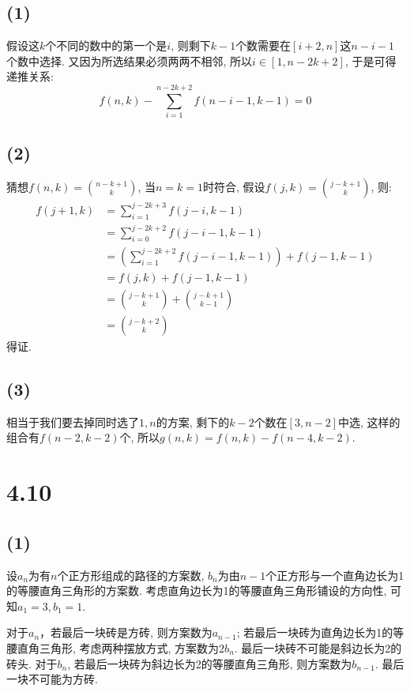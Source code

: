 \documentclass[UTF8,oneside]{article}
\begin{document}
\subsection{(1)}

假设这$k$个不同的数中的第一个是$i$, 则剩下$k-1$个数需要在$[i+2, n]$这$n-i-1$个数中选择. 又因为所选结果必须两两不相邻, 所以$i\in[1, n-2k+2]$, 于是可得递推关系:
\[
    f(n, k) - \sum_{i=1}^{n-2k+2} f(n-i-1, k-1) = 0
\]

\subsection{(2)}

猜想$f(n, k)=\binom{n-k+1}{k}$, 当$n=k=1$时符合, 假设$f(j, k)=\binom{j-k+1}{k}$, 则:
\begin{align*}
    f(j+1, k) &= \sum_{i=1}^{j-2k+3} f(j-i, k-1)\\
    &= \sum_{i=0}^{j-2k+2} f(j-i-1, k-1)\\
    &= \left (\sum_{i=1}^{j-2k+2} f(j-i-1, k-1) \right ) + f(j-1, k-1) \\
    &= f(j, k) + f(j-1, k-1) \\
    &= \binom{j-k+1}{k} + \binom{j-k+1}{k-1}\\
    &= \binom{j-k+2}{k}
\end{align*}
得证.

\subsection{(3)}

相当于我们要去掉同时选了$1,n$的方案, 剩下的$k-2$个数在$[3, n-2]$中选, 这样的组合有$f(n-2, k-2)$个, 所以$g(n,k) = f(n, k) - f(n-4, k-2)$.

\section{4.10}

\subsection{(1)}

设$a_n$为有$n$个正方形组成的路径的方案数, $b_n$为由$n-1$个正方形与一个直角边长为1的等腰直角三角形的方案数. 考虑直角边长为1的等腰直角三角形铺设的方向性, 可知$a_1=3, b_1=1$. 

对于$a_n$，若最后一块砖是方砖, 则方案数为$a_{n-1}$; 若最后一块砖为直角边长为1的等腰直角三角形, 考虑两种摆放方式, 方案数为$2b_n$. 最后一块砖不可能是斜边长为2的砖头. 对于$b_n$, 若最后一块砖为斜边长为2的等腰直角三角形, 则方案数为$b_{n-1}$. 最后一块不可能为方砖.
\end{document}
